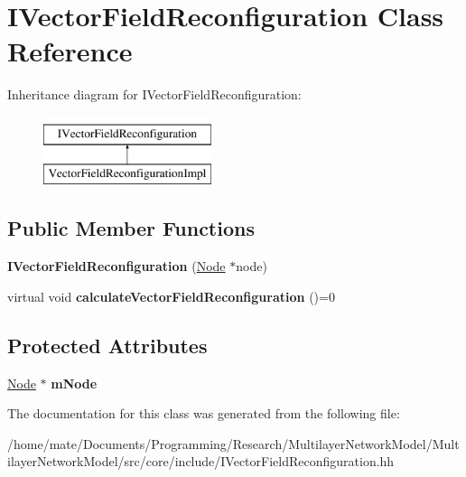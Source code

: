 \hypertarget{classIVectorFieldReconfiguration}{}\section{I\+Vector\+Field\+Reconfiguration Class Reference}
\label{classIVectorFieldReconfiguration}
Inheritance diagram for I\+Vector\+Field\+Reconfiguration\+:\begin{figure}[H]
\begin{center}
\leavevmode
\includegraphics[height=2.000000cm]{classIVectorFieldReconfiguration}
\end{center}
\end{figure}
\subsection*{Public Member Functions}
\begin{DoxyCompactItemize}
\item 
{\bfseries I\+Vector\+Field\+Reconfiguration} (\hyperlink{classNode}{Node} $\ast$node)\hypertarget{classIVectorFieldReconfiguration_a6b663421658c873129a81c3597e0a4c1}{}\label{classIVectorFieldReconfiguration_a6b663421658c873129a81c3597e0a4c1}

\item 
virtual void {\bfseries calculate\+Vector\+Field\+Reconfiguration} ()=0\hypertarget{classIVectorFieldReconfiguration_a3d4ae2c51645c6e6e1955d7ea152ec04}{}\label{classIVectorFieldReconfiguration_a3d4ae2c51645c6e6e1955d7ea152ec04}

\end{DoxyCompactItemize}
\subsection*{Protected Attributes}
\begin{DoxyCompactItemize}
\item 
\hyperlink{classNode}{Node} $\ast$ {\bfseries m\+Node}\hypertarget{classIVectorFieldReconfiguration_a3a8452d0f63f8c9e05e1ad6faab26325}{}\label{classIVectorFieldReconfiguration_a3a8452d0f63f8c9e05e1ad6faab26325}

\end{DoxyCompactItemize}


The documentation for this class was generated from the following file\+:\begin{DoxyCompactItemize}
\item 
/home/mate/\+Documents/\+Programming/\+Research/\+Multilayer\+Network\+Model/\+Multilayer\+Network\+Model/src/core/include/I\+Vector\+Field\+Reconfiguration.\+hh\end{DoxyCompactItemize}
